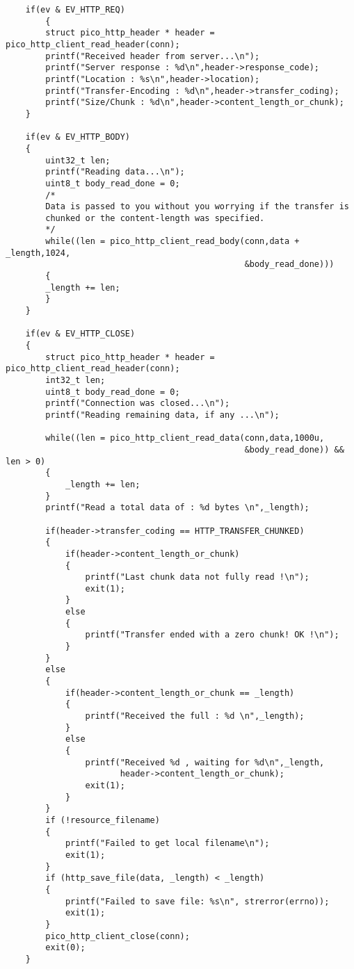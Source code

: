 \begin{verbatim}
    if(ev & EV_HTTP_REQ)
        {
        struct pico_http_header * header = pico_http_client_read_header(conn);
        printf("Received header from server...\n");
        printf("Server response : %d\n",header->response_code);
        printf("Location : %s\n",header->location);
        printf("Transfer-Encoding : %d\n",header->transfer_coding);
        printf("Size/Chunk : %d\n",header->content_length_or_chunk);
    }

    if(ev & EV_HTTP_BODY)
    {
        uint32_t len;
        printf("Reading data...\n");
        uint8_t body_read_done = 0;
        /*
        Data is passed to you without you worrying if the transfer is
        chunked or the content-length was specified.
        */
        while((len = pico_http_client_read_body(conn,data + _length,1024,
                                                &body_read_done)))
        {
        _length += len;
        }
    }

    if(ev & EV_HTTP_CLOSE)
    {
        struct pico_http_header * header = pico_http_client_read_header(conn);
        int32_t len;
        uint8_t body_read_done = 0;
        printf("Connection was closed...\n");
        printf("Reading remaining data, if any ...\n");

        while((len = pico_http_client_read_data(conn,data,1000u,
                                                &body_read_done)) && len > 0)
        {
            _length += len;
        }
        printf("Read a total data of : %d bytes \n",_length);

        if(header->transfer_coding == HTTP_TRANSFER_CHUNKED)
        {
            if(header->content_length_or_chunk)
            {
                printf("Last chunk data not fully read !\n");
                exit(1);
            }
            else
            {
                printf("Transfer ended with a zero chunk! OK !\n");
            }
        }
        else
        {
            if(header->content_length_or_chunk == _length)
            {
                printf("Received the full : %d \n",_length);
            }
            else
            {
                printf("Received %d , waiting for %d\n",_length,
                       header->content_length_or_chunk);
                exit(1);
            }
        }
        if (!resource_filename)
        {
            printf("Failed to get local filename\n");
            exit(1);
        }
        if (http_save_file(data, _length) < _length)
        {
            printf("Failed to save file: %s\n", strerror(errno));
            exit(1);
        }
        pico_http_client_close(conn);
        exit(0);
    }


\end{verbatim}
